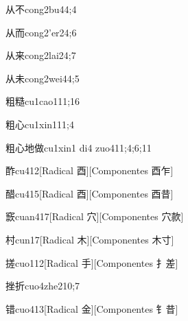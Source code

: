 \begin{verbete}{从不}{cong2bu4}{4;4}
\end{verbete}

\begin{verbete}{从而}{cong2'er2}{4;6}
\end{verbete}

\begin{verbete}{从来}{cong2lai2}{4;7}
\end{verbete}

\begin{verbete}{从未}{cong2wei4}{4;5}
\end{verbete}

\begin{verbete}{粗糙}{cu1cao1}{11;16}
\end{verbete}

\begin{verbete}{粗心}{cu1xin1}{11;4}
\end{verbete}

\begin{verbete}{粗心地做}{cu1xin1 di4 zuo4}{11;4;6;11}
\end{verbete}

\begin{verbete}{酢}{cu4}{12}[Radical 酉][Componentes 酉乍]
\end{verbete}

\begin{verbete}{醋}{cu4}{15}[Radical ⾣][Componentes ⾣昔]
\end{verbete}

\begin{verbete}{窾}{cuan4}{17}[Radical 穴][Componentes 穴款]
\end{verbete}

\begin{verbete}{村}{cun1}{7}[Radical ⽊][Componentes ⽊⼨]
\end{verbete}

\begin{verbete}{搓}{cuo1}{12}[Radical 手][Componentes ⺘差]
\end{verbete}

\begin{verbete}{挫折}{cuo4zhe2}{10;7}
\end{verbete}

\begin{verbete}{错}{cuo4}{13}[Radical 金][Componentes ⻐昔]
\end{verbete}

